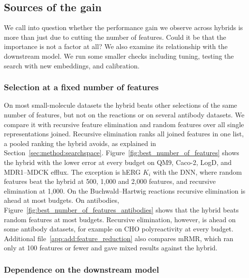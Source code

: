 \subsection{Sources of the gain}\label{sec:method:results_why}

We call into question whether the performance gain we observe across hybrids is more than just due to cutting the number of features. Could it be that the importance is not a factor at all? We also examine its relationship with the downstream model. We run some smaller checks including tuning, testing the search with new embeddings, and calibration.

\subsubsection{Selection at a fixed number of features}

On most small-molecule datasets the hybrid beats other selections of the same number of features, but not on the reactions or on several antibody datasets. We compare it with recursive feature elimination and random features over all single representations joined. Recursive elimination ranks all joined features in one list, a pooled ranking the hybrid avoids, as explained in Section~\ref{sec:method:searchspace}. Figure~\ref{fig:best_number_of_features} shows the hybrid with the lower error at every budget on QM9, Caco-2, LogD, and MDR1--MDCK efflux. The exception is hERG $K_i$ with the DNN, where random features beat the hybrid at 500, 1,000 and 2,000 features, and recursive elimination at 1,000. On the Buchwald--Hartwig reactions recursive elimination is ahead at most budgets. On antibodies, Figure~\ref{fig:best_number_of_features_antibodies} shows that the hybrid beats random features at most budgets. Recursive elimination, however, is ahead on some antibody datasets, for example on CHO polyreactivity at every budget. Additional file~\ref{app:add:feature_reduction} also compares mRMR, which ran only at 100 features or fewer and gave mixed results against the hybrid.

\subsubsection{Dependence on the downstream model}

